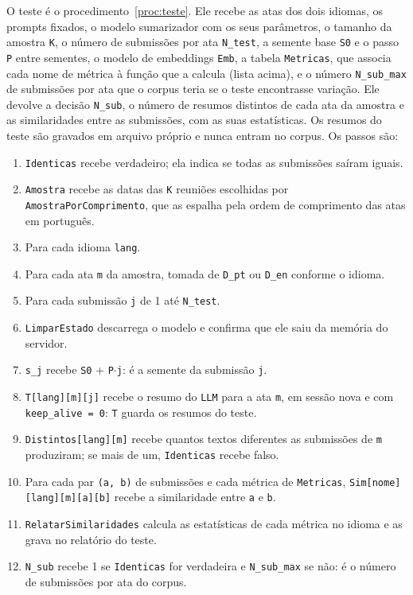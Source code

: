 \documentclass[12pt]{article}
\begin{document}
O teste é o procedimento~\ref{proc:teste}. Ele recebe as atas dos dois idiomas,
os prompts fixados, o modelo sumarizador com os seus parâmetros, o tamanho da
amostra \texttt{K}, o número de submissões por ata \texttt{N\_test}, a semente
base \texttt{S0} e o passo \texttt{P} entre sementes, o modelo de embeddings
\texttt{Emb}, a tabela \texttt{Metricas}, que associa cada nome de métrica à
função que a calcula (lista acima), e o número \texttt{N\_sub\_max}
de submissões por ata que o corpus teria se o teste encontrasse variação. Ele
devolve a decisão \texttt{N\_sub}, o número de resumos distintos de cada ata da
amostra e as similaridades entre as submissões, com as suas estatísticas. Os
resumos do teste são gravados em arquivo próprio e nunca entram no corpus. Os
passos são:
\begin{enumerate}
\item \texttt{Identicas} recebe verdadeiro; ela indica se todas as submissões
  saíram iguais.
\item \texttt{Amostra} recebe as datas das \texttt{K} reuniões escolhidas por
  \texttt{AmostraPorComprimento}, que as espalha pela ordem de comprimento das
  atas em português.
\item Para cada idioma \texttt{lang}.
\item Para cada ata \texttt{m} da amostra, tomada de \texttt{D\_pt} ou
  \texttt{D\_en} conforme o idioma.
\item Para cada submissão \texttt{j} de 1 até \texttt{N\_test}.
\item \texttt{LimparEstado} descarrega o modelo e confirma que ele saiu da
  memória do servidor.
\item \texttt{s\_j} recebe \texttt{S0} + \texttt{P}$\cdot$\texttt{j}: é a
  semente da submissão \texttt{j}.
\item \texttt{T[lang][m][j]} recebe o resumo do \texttt{LLM} para a ata
  \texttt{m}, em sessão nova e com \texttt{keep\_alive = 0}: \texttt{T} guarda
  os resumos do teste.
\item \texttt{Distintos[lang][m]} recebe quantos textos diferentes as
  submissões de \texttt{m} produziram; se mais de um, \texttt{Identicas} recebe
  falso.
\item Para cada par \texttt{(a, b)} de submissões e cada métrica de
  \texttt{Metricas}, \texttt{Sim[nome][lang][m][a][b]} recebe a similaridade
  entre \texttt{a} e \texttt{b}.
\item \texttt{RelatarSimilaridades} calcula as estatísticas de cada métrica no
  idioma e as grava no relatório do teste.
\item \texttt{N\_sub} recebe 1 se \texttt{Identicas} for verdadeira e
  \texttt{N\_sub\_max} se não: é o número de submissões por ata do corpus.
\end{enumerate}
\end{document}

